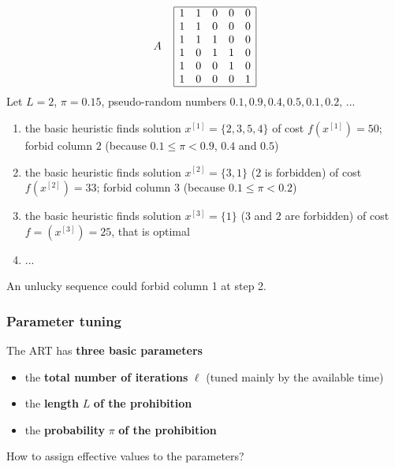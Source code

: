 $$
A \;\;\;\;
\begin{array}{| c c c c c |}
	\hline
	1 & 1 & 0 & 0 & 0 \\
	1 & 1 & 0 & 0 & 0 \\
	1 & 1 & 1 & 0 & 0 \\
	1 & 0 & 1 & 1 & 0 \\
	1 & 0 & 0 & 1 & 0 \\
	1 & 0 & 0 & 0 & 1 \\
	\hline
\end{array}
$$
Let $L = 2$, $\pi = 0.15$, pseudo-random numbers $0.1, 0.9, 0.4, 0.5, 0.1, 0.2, \, ...$
\begin{enumerate}
	\item the basic heuristic finds solution $x^{[1]} = \{2, 3, 5, 4\}$ of cost $f \left(x^{[1]}\right) = 50$; forbid column $2$ (because $0.1 \leq \pi < 0.9$, $0.4$ and $0.5$)
	
	\item the basic heuristic finds solution $x^{[2]} = \{3, 1\}$ ($2$ is forbidden) of cost $f \left(x^{[2]}\right) = 33$; forbid column $3$ (because $0.1 \leq \pi < 0.2$)
	
	\item the basic heuristic finds solution $x^{[3]} = \{1\}$ ($3$ and $2$ are forbidden) of cost $f = \left(x^{[3]}\right) = 25$, that is optimal
	
	\item ...
\end{enumerate}
An unlucky sequence could forbid column 1 at step 2.\\

\newpage

\subsubsection{Parameter tuning}
The ART has \textbf{three basic parameters}
\begin{itemize}
	\item the \textbf{total number of iterations} $\ell$ (tuned mainly by the available time)
	\item the \textbf{length} $L$ \textbf{of the prohibition}
	\item the \textbf{probability} $\pi$ \textbf{of the prohibition}
\end{itemize}

How to assign effective values to the parameters? \\

